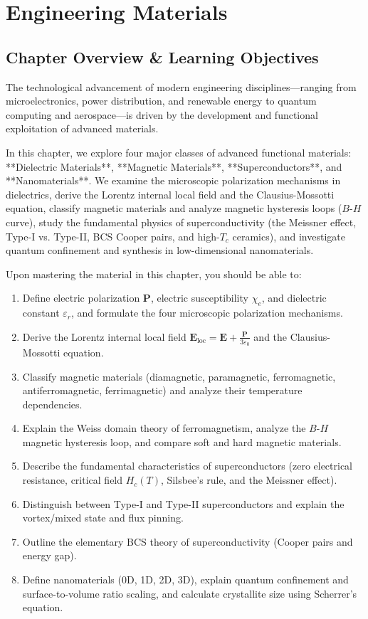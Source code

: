 \chapter{Engineering Materials}
\label{chap:materials}

\section{Chapter Overview \& Learning Objectives}
The technological advancement of modern engineering disciplines—ranging from microelectronics, power distribution, and renewable energy to quantum computing and aerospace—is driven by the development and functional exploitation of advanced materials.

In this chapter, we explore four major classes of advanced functional materials: **Dielectric Materials**, **Magnetic Materials**, **Superconductors**, and **Nanomaterials**. We examine the microscopic polarization mechanisms in dielectrics, derive the Lorentz internal local field and the Clausius-Mossotti equation, classify magnetic materials and analyze magnetic hysteresis loops ($B$-$H$ curve), study the fundamental physics of superconductivity (the Meissner effect, Type-I vs. Type-II, BCS Cooper pairs, and high-$T_c$ ceramics), and investigate quantum confinement and synthesis in low-dimensional nanomaterials.

\begin{important}
Upon mastering the material in this chapter, you should be able to:
\begin{enumerate}
    \item Define electric polarization $\mathbf{P}$, electric susceptibility $\chi_e$, and dielectric constant $\varepsilon_r$, and formulate the four microscopic polarization mechanisms.
    \item Derive the Lorentz internal local field $\mathbf{E}_{\text{loc}} = \mathbf{E} + \frac{\mathbf{P}}{3\varepsilon_0}$ and the Clausius-Mossotti equation.
    \item Classify magnetic materials (diamagnetic, paramagnetic, ferromagnetic, antiferromagnetic, ferrimagnetic) and analyze their temperature dependencies.
    \item Explain the Weiss domain theory of ferromagnetism, analyze the $B$-$H$ magnetic hysteresis loop, and compare soft and hard magnetic materials.
    \item Describe the fundamental characteristics of superconductors (zero electrical resistance, critical field $H_c(T)$, Silsbee's rule, and the Meissner effect).
    \item Distinguish between Type-I and Type-II superconductors and explain the vortex/mixed state and flux pinning.
    \item Outline the elementary BCS theory of superconductivity (Cooper pairs and energy gap).
    \item Define nanomaterials (0D, 1D, 2D, 3D), explain quantum confinement and surface-to-volume ratio scaling, and calculate crystallite size using Scherrer's equation.
\end{enumerate}
\end{important}

